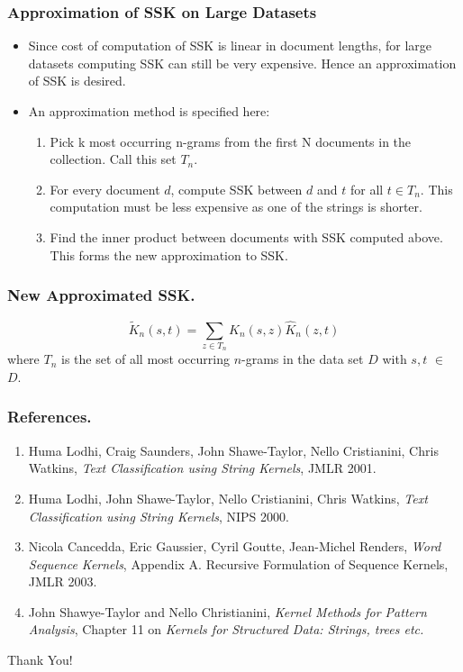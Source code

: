 \documentclass[10pt]{beamer}
\begin{document}
\begin{frame}
	\frametitle{Approximation of SSK on Large Datasets}
	\begin{itemize}
		\item Since cost of computation of SSK is linear in document lengths, for large datasets computing SSK can still be very expensive.
				Hence an approximation of SSK is desired.
		\item An approximation method is specified here:
		\begin{enumerate}
			\item Pick k most occurring n-grams from the first N documents in the collection. Call this set $T_n$.
			\item For every document $d$, compute SSK between $d$ and $t$ for all $t \in T_n$. This computation must be less expensive as one of the strings is shorter.
			\item Find the inner product between documents with SSK computed above. This forms the new approximation to SSK.
		\end{enumerate}
	\end{itemize}

\end{frame}

\begin{frame}
	\frametitle{New Approximated SSK.}
	\begin{equation}
		\tilde{K}_n(s,t) = \sum_{z \in T_n} \hat{K}_n(s,z) \hat{K}_n(z,t) 
	\end{equation}
		where $T_n$ is the set of all most occurring $n$-grams in the data set $D$ with $s,t$ $\in$ $D$.
\end{frame}

\begin{frame}
	\frametitle{References.}
	\begin{enumerate}
		\item Huma Lodhi, Craig Saunders, John Shawe-Taylor, Nello Cristianini, Chris Watkins, \textit{Text Classification using String Kernels}, JMLR 2001.
		\item Huma Lodhi, John Shawe-Taylor, Nello Cristianini, Chris Watkins, \textit{Text Classification using String Kernels}, NIPS 2000.
		\item Nicola Cancedda, Eric Gaussier, Cyril Goutte, Jean-Michel Renders, \textit{Word Sequence Kernels}, Appendix A. Recursive Formulation of Sequence Kernels, JMLR 2003.
		\item John Shawye-Taylor and Nello Christianini, \textit{Kernel Methods for Pattern Analysis}, Chapter 11 on \textit{Kernels for Structured Data: Strings, trees etc.}
	\end{enumerate}
\end{frame}

\begin{frame}
	\begin{center} \Huge{Thank You!} \end{center}
\end{frame}
\end{document}
